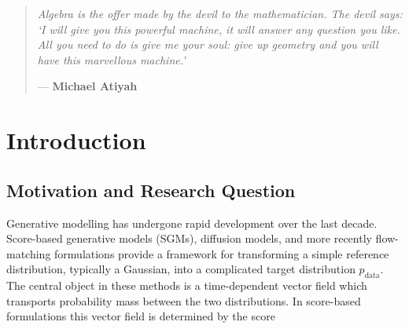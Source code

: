 \documentclass{article}
\theoremstyle{plain}
\theoremstyle{definition}
\theoremstyle{remark}
\begin{document}
\newpage

\begin{abstract}
    Diffusion based generative models have become ubiquitous over recent years. Their success is often attributed to the geometric structure of natural data; commonly referred to as the manifold hypothesis. In this report we summarise our main work so far on understanding the geometrical structures of densities undergoing diffusion. We examine an anisotropic stability bound, level sets, ridges, and functionals of the posterior covariance. Ultimately, we settle on the spectrum of the posterior covariance being the key object to understanding the geometry throughout the diffusion process. This yields key quantities to understand diffusion's impact on the geometry of densities, and a natural denoising discretisation schedule.
\end{abstract}

\vspace{30mm}


\begin{quote}
    \itshape
    Algebra is the offer made by the devil to the mathematician. The devil says: `I will give you this powerful machine, it will answer any question you like. All you need to do is give me your soul: give up geometry and you will have this marvellous machine.' 
    \smallskip 
    
    \hfill --- \textbf{Michael Atiyah}
\end{quote}


\newpage

\section{Introduction}
\label{sec:intro}

\subsection{Motivation and Research Question}
\label{subsec:intro-motivation}

Generative modelling has undergone rapid development over the last decade. Score-based generative models (SGMs), diffusion models, and more recently flow-matching formulations provide a framework for transforming a simple reference distribution, typically a Gaussian, into a complicated target distribution $p_{\mathrm{data}}$. The central object in these methods is a time-dependent vector field which transports probability mass between the two distributions. In score-based formulations this vector field is determined by the score
\end{document}

